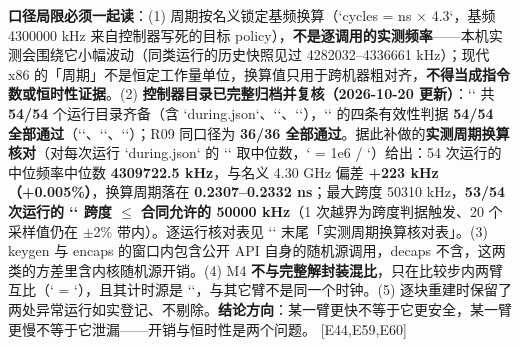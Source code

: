 \documentclass[UTF8,fontset=fandol,11pt,a4paper]{ctexart}
\begin{document}
\textbf{口径局限必须一起读}：(1) 周期按名义锁定基频换算（`cycles = ns \texorpdfstring{$\times$}{x} 4.3`，基频 4300000 kHz 来自控制器写死的目标 policy），\textbf{不是逐调用的实测频率}——本机实测会围绕它小幅波动（同类运行的历史快照见过 4282032–4336661 kHz）；现代 x86 的「周期」不是恒定工作量单位，换算值只用于跨机器粗对齐，\textbf{不得当成指令数或恒时性证据}。(2) \textbf{控制器目录已完整归档并复核（2026-10-20 更新）}：`\texttt{}` 共 \textbf{54/54} 个运行目录齐备（含 `during.json`、`\texttt{}`、`\texttt{}`），`\texttt{}` 的四条有效性判据 \textbf{54/54 全部通过}（`\texttt{}`、`\texttt{}`、`\texttt{}`）；R09 同口径为 \textbf{36/36 全部通过}。据此补做的\textbf{实测周期换算核对}（对每次运行 `during.json` 的 `\texttt{}` 取中位数，`\texttt{} = 1e6 / \texttt{}`）给出：54 次运行的中位频率中位数 \textbf{4309722.5 kHz}，与名义 4.30 GHz 偏差 \textbf{+223 kHz（+0.005\%）}，换算周期落在 \textbf{0.2307–0.2332 ns}；最大跨度 50310 kHz，\textbf{53/54 次运行的 `\texttt{}` 跨度 \texorpdfstring{$\le$}{<=} 合同允许的 50000 kHz}（1 次越界为跨度判据触发、20 个采样值仍在 \texorpdfstring{$\pm$}{+-}2\% 带内）。逐运行核对表见 `\texttt{}` 末尾「实测周期换算核对表」。(3) keygen 与 encaps 的窗口内包含公开 API 自身的随机源调用，decaps 不含，这两类的方差里含内核随机源开销。(4) M4 \textbf{不与完整解封装混比}，只在比较步内两臂互比（`\texttt{} = \texttt{}`），且其计时源是 `\texttt{}`，与其它臂不是同一个时钟。(5) 逐块重建时保留了两处异常运行如实登记、不剔除。\textbf{结论方向}：某一臂更快不等于它更安全，某一臂更慢不等于它泄漏——开销与恒时性是两个问题。 [E44,E59,E60]
\end{document}
